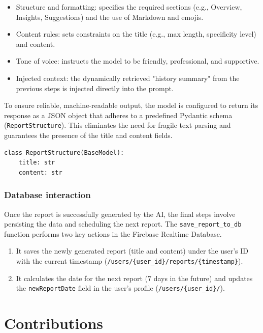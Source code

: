 \documentclass{article}
\begin{document}
\begin{itemize}
	\item Structure and formatting: specifies the required sections (e.g., Overview, Insights, Suggestions) and the use of Markdown and emojis.
	\item Content rules: sets constraints on the title (e.g., max length, specificity level) and content.
	\item Tone of voice: instructs the model to be friendly, professional, and supportive.
	\item Injected context: the dynamically retrieved "history summary" from the previous steps is injected directly into the prompt.
\end{itemize}

To ensure reliable, machine-readable output, the model is configured to return its response as a JSON object that adheres to a predefined Pydantic schema (\verb|ReportStructure|).
This eliminates the need for fragile text parsing and guarantees the presence of the title and content fields.

\begin{verbatim}
class ReportStructure(BaseModel):
    title: str
    content: str
\end{verbatim}

\subsubsection{Database interaction}

Once the report is successfully generated by the AI, the final steps involve persisting the data and scheduling the next report.
The \verb|save_report_to_db| function performs two key actions in the Firebase Realtime Database.

\begin{enumerate}
	\item It saves the newly generated report (title and content) under the user’s ID with the current timestamp (\verb|/users/{user_id}/reports/{timestamp}|).
	\item It calculates the date for the next report (7 days in the future) and updates the \verb|newReportDate| field in the user’s profile (\verb|/users/{user_id}/|).
\end{enumerate}

\section{Contributions}
\end{document}
